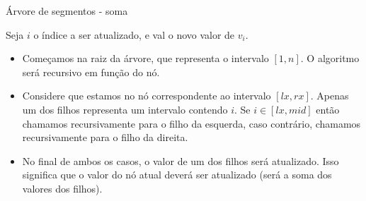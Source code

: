 \begin{frame}{Árvore de segmentos - soma}

    Seja $i$ o índice a ser atualizado, e val o novo valor de $v_i$.
    \begin{itemize}
        \item Começamos na raiz da árvore, que representa o intervalo $[1, n]$. O algoritmo será recursivo em função do nó.
        \item Considere que estamos no nó correspondente ao intervalo $[lx, rx]$. Apenas um dos filhos representa um intervalo contendo $i$. Se $i \in [lx, mid]$ então chamamos recursivamente para o filho da esquerda, caso contrário, chamamos recursivamente para o filho da direita.
        \item No final de ambos os casos, o valor de um dos filhos será atualizado. Isso significa que o valor do nó atual deverá ser atualizado (será a soma dos valores dos filhos).
    \end{itemize}


\end{frame}
